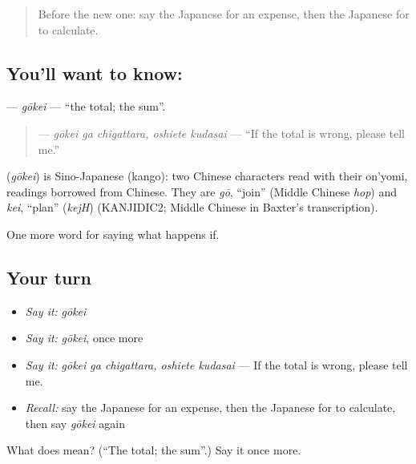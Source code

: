 \begin{quote}
Before the new one: say the Japanese for an expense, then the Japanese for to calculate.
\end{quote}

\subsection*{You'll want to know: }
\textbf{} — \emph{gōkei} — \textquotedblleft{}the total; the sum\textquotedblright{}.

\begin{quote}
\textbf{  } — \emph{gōkei ga chigattara, oshiete kudasai} — \textquotedblleft{}If the total is wrong, please tell me.\textquotedblright{}
\end{quote}

\begin{cousinweb}
\textbf{} (\emph{gōkei}) is Sino-Japanese (kango): two Chinese characters read with their on'yomi, readings borrowed from Chinese. They are \emph{gō}, \textquotedblleft{}join\textquotedblright{} (Middle Chinese \emph{hop}) and \emph{kei}, \textquotedblleft{}plan\textquotedblright{} (\emph{kejH}) (KANJIDIC2; Middle Chinese in Baxter's transcription).
\end{cousinweb}

\begin{grammarlens}[title={What you've built}]
One more word for saying what happens if.
\end{grammarlens}

\subsection*{Your turn}
\begin{itemize}
\raggedright
  \item \emph{Say it:} \emph{gōkei}
  \item \emph{Say it:} \emph{gōkei}, once more
  \item \emph{Say it:} \emph{gōkei ga chigattara, oshiete kudasai} — If the total is wrong, please tell me.
  \item \emph{Recall:} say the Japanese for an expense, then the Japanese for to calculate, then say \emph{gōkei} again
\end{itemize}

\begin{tcolorbox}[breakable,colback=teal!4,colframe=teal!35!black,title={Before you move on}]
What does  mean? (\textquotedblleft{}The total; the sum\textquotedblright{}.) Say it once more.
\end{tcolorbox}
